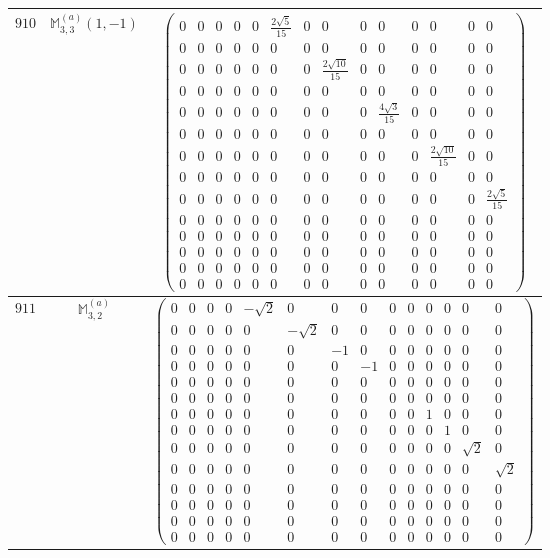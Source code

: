 \documentclass[fleqn,8pt,landscape]{jsarticle}
\begin{document}
\begin{center}
\begin{longtable}{ccc}
$ 910 $ & $ \mathbb{M}_{3,3}^{(a)}(1,-1) $ & $ \begin{pmatrix} 0 & 0 & 0 & 0 & 0 & \frac{2 \sqrt{5}}{15} & 0 & 0 & 0 & 0 & 0 & 0 & 0 & 0 \\ 0 & 0 & 0 & 0 & 0 & 0 & 0 & 0 & 0 & 0 & 0 & 0 & 0 & 0 \\ 0 & 0 & 0 & 0 & 0 & 0 & 0 & \frac{2 \sqrt{10}}{15} & 0 & 0 & 0 & 0 & 0 & 0 \\ 0 & 0 & 0 & 0 & 0 & 0 & 0 & 0 & 0 & 0 & 0 & 0 & 0 & 0 \\ 0 & 0 & 0 & 0 & 0 & 0 & 0 & 0 & 0 & \frac{4 \sqrt{3}}{15} & 0 & 0 & 0 & 0 \\ 0 & 0 & 0 & 0 & 0 & 0 & 0 & 0 & 0 & 0 & 0 & 0 & 0 & 0 \\ 0 & 0 & 0 & 0 & 0 & 0 & 0 & 0 & 0 & 0 & 0 & \frac{2 \sqrt{10}}{15} & 0 & 0 \\ 0 & 0 & 0 & 0 & 0 & 0 & 0 & 0 & 0 & 0 & 0 & 0 & 0 & 0 \\ 0 & 0 & 0 & 0 & 0 & 0 & 0 & 0 & 0 & 0 & 0 & 0 & 0 & \frac{2 \sqrt{5}}{15} \\ 0 & 0 & 0 & 0 & 0 & 0 & 0 & 0 & 0 & 0 & 0 & 0 & 0 & 0 \\ 0 & 0 & 0 & 0 & 0 & 0 & 0 & 0 & 0 & 0 & 0 & 0 & 0 & 0 \\ 0 & 0 & 0 & 0 & 0 & 0 & 0 & 0 & 0 & 0 & 0 & 0 & 0 & 0 \\ 0 & 0 & 0 & 0 & 0 & 0 & 0 & 0 & 0 & 0 & 0 & 0 & 0 & 0 \\ 0 & 0 & 0 & 0 & 0 & 0 & 0 & 0 & 0 & 0 & 0 & 0 & 0 & 0 \end{pmatrix} $ \\ \hline
$ 911 $ & $ \mathbb{M}_{3,2}^{(a)} $ & $ \begin{pmatrix} 0 & 0 & 0 & 0 & - \sqrt{2} & 0 & 0 & 0 & 0 & 0 & 0 & 0 & 0 & 0 \\ 0 & 0 & 0 & 0 & 0 & - \sqrt{2} & 0 & 0 & 0 & 0 & 0 & 0 & 0 & 0 \\ 0 & 0 & 0 & 0 & 0 & 0 & -1 & 0 & 0 & 0 & 0 & 0 & 0 & 0 \\ 0 & 0 & 0 & 0 & 0 & 0 & 0 & -1 & 0 & 0 & 0 & 0 & 0 & 0 \\ 0 & 0 & 0 & 0 & 0 & 0 & 0 & 0 & 0 & 0 & 0 & 0 & 0 & 0 \\ 0 & 0 & 0 & 0 & 0 & 0 & 0 & 0 & 0 & 0 & 0 & 0 & 0 & 0 \\ 0 & 0 & 0 & 0 & 0 & 0 & 0 & 0 & 0 & 0 & 1 & 0 & 0 & 0 \\ 0 & 0 & 0 & 0 & 0 & 0 & 0 & 0 & 0 & 0 & 0 & 1 & 0 & 0 \\ 0 & 0 & 0 & 0 & 0 & 0 & 0 & 0 & 0 & 0 & 0 & 0 & \sqrt{2} & 0 \\ 0 & 0 & 0 & 0 & 0 & 0 & 0 & 0 & 0 & 0 & 0 & 0 & 0 & \sqrt{2} \\ 0 & 0 & 0 & 0 & 0 & 0 & 0 & 0 & 0 & 0 & 0 & 0 & 0 & 0 \\ 0 & 0 & 0 & 0 & 0 & 0 & 0 & 0 & 0 & 0 & 0 & 0 & 0 & 0 \\ 0 & 0 & 0 & 0 & 0 & 0 & 0 & 0 & 0 & 0 & 0 & 0 & 0 & 0 \\ 0 & 0 & 0 & 0 & 0 & 0 & 0 & 0 & 0 & 0 & 0 & 0 & 0 & 0 \end{pmatrix} $ \\ \hline

\end{longtable}
\end{center}
\end{document}

